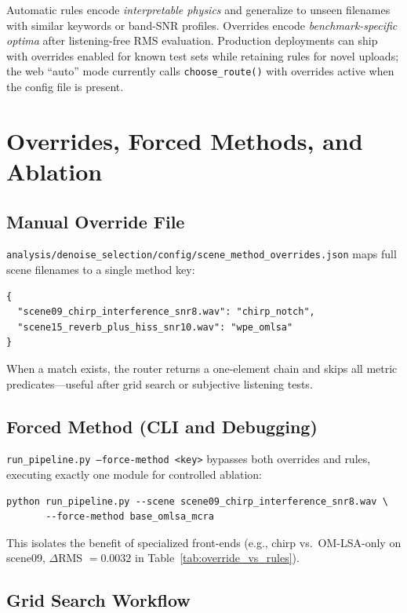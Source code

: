 \begin{remark}
Automatic rules encode \emph{interpretable physics} and generalize to unseen filenames with similar keywords or band-SNR profiles. Overrides encode \emph{benchmark-specific optima} after listening-free RMS evaluation. Production deployments can ship with overrides enabled for known test sets while retaining rules for novel uploads; the web ``auto'' mode currently calls \texttt{choose\_route()} with overrides active when the config file is present.
\end{remark}


\section{Overrides, Forced Methods, and Ablation}
\label{sec:overrides}

\subsection{Manual Override File}

\texttt{analysis/denoise\_selection/config/scene\_method\_overrides.json} maps full scene filenames to a single method key:
\begin{verbatim}
{
  "scene09_chirp_interference_snr8.wav": "chirp_notch",
  "scene15_reverb_plus_hiss_snr10.wav": "wpe_omlsa"
}
\end{verbatim}
When a match exists, the router returns a one-element chain and skips all metric predicates---useful after grid search or subjective listening tests.

\subsection{Forced Method (CLI and Debugging)}

\texttt{run\_pipeline.py --force-method <key>} bypasses both overrides and rules, executing exactly one module for controlled ablation:
\begin{verbatim}
python run_pipeline.py --scene scene09_chirp_interference_snr8.wav \
       --force-method base_omlsa_mcra
\end{verbatim}
This isolates the benefit of specialized front-ends (e.g., chirp vs.\ OM-LSA-only on scene09, $\Delta$RMS $=0.0032$ in Table~\ref{tab:override_vs_rules}).

\subsection{Grid Search Workflow}

